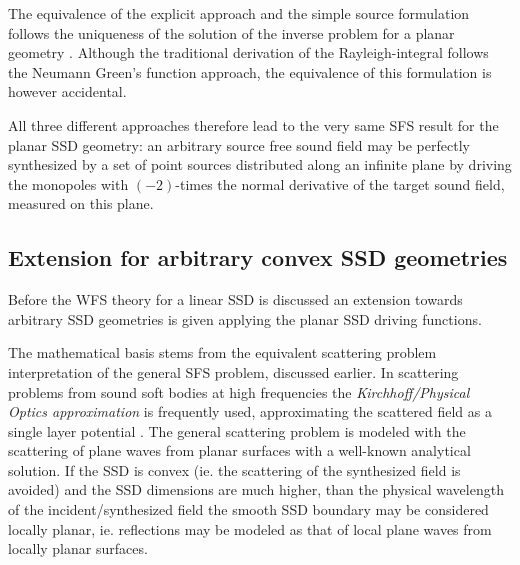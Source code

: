 The equivalence of the explicit approach and the simple source formulation follows the uniqueness of the solution of the inverse problem for a planar geometry \cite{Fazi2010}. Although the traditional derivation of the Rayleigh-integral follows the Neumann Green's function approach, the equivalence of this formulation is however accidental.

All three different approaches therefore lead to the very same SFS result for the planar SSD geometry: an arbitrary source free sound field may be perfectly synthesized by a set of point sources distributed along an infinite plane by driving the monopoles with $(-2)$-times the normal derivative of the target sound field, measured on this plane.

\subsection{Extension for arbitrary convex SSD geometries}

Before the WFS theory for a linear SSD is discussed an extension towards arbitrary SSD geometries is given applying the planar SSD driving functions.

The mathematical basis stems from the equivalent scattering problem interpretation of the general SFS problem, discussed earlier. 
In scattering problems from sound soft bodies at high frequencies the \emph{Kirchhoff/Physical Optics approximation} is frequently used, approximating the scattered field as a single layer potential \cite{Fazi2013:Equivalent_scattering, ColtonKress1998}.
The general scattering problem is modeled with the scattering of plane waves from planar surfaces with a well-known analytical solution.
If the SSD is convex (ie. the scattering of the synthesized field is avoided) and the SSD dimensions are much higher, than the physical wavelength of the incident/synthesized field the smooth SSD boundary may be considered locally planar, ie. reflections may be modeled as that of local plane waves from locally planar surfaces.

